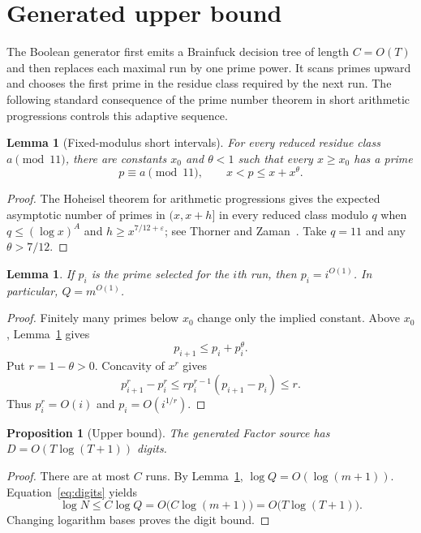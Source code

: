 \documentclass[10pt]{article}
\newtheorem{lemma}[theorem]{Lemma}
\newtheorem{proposition}[theorem]{Proposition}
\theoremstyle{remark}
\begin{document}
\section{Generated upper bound}

The Boolean generator first emits a Brainfuck decision tree of length
$C=O(T)$ and then replaces each maximal run by one prime power.  It scans
primes upward and chooses the first prime in the residue class required by
the next run.  The following standard consequence of the prime number theorem
in short arithmetic progressions controls this adaptive sequence.

\begin{lemma}[Fixed-modulus short intervals]\label{lem:short}
For every reduced residue class $a\pmod {11}$, there are constants
$x_0$ and $\theta<1$ such that every $x\ge x_0$ has a prime
\[
  p\equiv a\pmod {11},
  \qquad x<p\le x+x^\theta.
\]
\end{lemma}

\begin{proof}
The Hoheisel theorem for arithmetic progressions gives the expected
asymptotic number of primes in $(x,x+h]$ in every reduced class modulo $q$
when $q\le(\log x)^A$ and $h\ge x^{7/12+\varepsilon}$; see
Thorner and Zaman~\cite{thorner-zaman}.  Take $q=11$ and any
$\theta>7/12$.
\end{proof}

\begin{lemma}\label{lem:adaptive}
If $p_i$ is the prime selected for the $i$th run, then
$p_i=i^{O(1)}$.  In particular, $Q=m^{O(1)}$.
\end{lemma}

\begin{proof}
Finitely many primes below $x_0$ change only the implied constant.  Above
$x_0$, Lemma~\ref{lem:short} gives
\[
  p_{i+1}\le p_i+p_i^\theta.
\]
Put $r=1-\theta>0$.  Concavity of $x^r$ gives
\[
  p_{i+1}^r-p_i^r
  \le r p_i^{r-1}(p_{i+1}-p_i)\le r.
\]
Thus $p_i^r=O(i)$ and $p_i=O(i^{1/r})$.
\end{proof}

\begin{proposition}[Upper bound]\label{prop:upper}
The generated Factor source has $D=O(T\log(T+1))$ digits.
\end{proposition}

\begin{proof}
There are at most $C$ runs.  By Lemma~\ref{lem:adaptive},
$\log Q=O(\log(m+1))$.  Equation~\eqref{eq:digits} yields
\[
  \log N\le C\log Q
  =O\bigl(C\log(m+1)\bigr)
  =O\bigl(T\log(T+1)\bigr).
\]
Changing logarithm bases proves the digit bound.
\end{proof}
\end{document}
